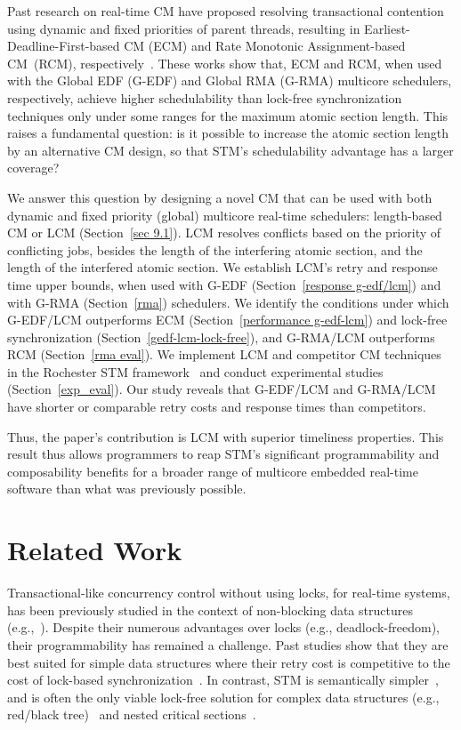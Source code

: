 \documentclass[letter]{sig-alternate}
\begin{document}
Past research on real-time CM have proposed resolving transactional contention using dynamic and fixed priorities of parent threads, resulting in Earliest-Deadline-First-based CM (ECM) and Rate Monotonic Assignment-based CM~(RCM), respectively~\cite{fahmy2009bounding,fahmy2009response,stmconcurrencycontrol:emsoft11}.
These works show that, ECM and RCM, when used with the Global EDF (G-EDF) and Global RMA  (G-RMA) multicore schedulers, respectively, achieve higher schedulability than lock-free synchronization techniques only under some ranges for the maximum atomic section length. This raises a fundamental question: is it possible to increase the atomic section length by an alternative CM design, so that STM's schedulability advantage has a larger coverage? 

We answer this question by designing a novel CM that can be used with both dynamic and fixed priority (global) multicore real-time schedulers: length-based CM or LCM (Section~\ref{sec 9.1}). LCM resolves conflicts based on the priority of conflicting jobs, besides the length of the interfering atomic section, and the length of the interfered atomic section.  We establish LCM's retry and response time upper bounds, when used with G-EDF (Section~\ref{response g-edf/lcm}) and with G-RMA (Section~\ref{rma}) schedulers. We identify the conditions under which G-EDF/LCM outperforms ECM (Section~\ref{performance g-edf-lcm}) and lock-free synchronization (Section~\ref{gedf-lcm-lock-free}), and G-RMA/LCM outperforms RCM (Section~\ref{rma eval}). 
We implement LCM and competitor CM techniques in the Rochester STM framework~\cite{marathe2006lowering} and conduct experimental studies (Section~\ref{exp_eval}). Our study reveals that G-EDF/LCM and G-RMA/LCM have shorter or comparable retry costs and response times than competitors. 

Thus, the paper's contribution is LCM with superior timeliness properties. This result thus allows programmers to reap STM's significant programmability and composability benefits for a broader range of multicore embedded real-time software than what was previously possible.


\section{Related Work}
\label{sec:past}

Transactional-like concurrency control without using locks, for real-time systems, has been previously studied in the context of non-blocking data structures (e.g.,~\cite{anderson95realtime}). Despite their numerous advantages over locks 
(e.g., deadlock-freedom), 
their programmability has remained a challenge. 
Past studies show that they are best suited for simple data structures where their retry cost is competitive to the cost of lock-based synchronization~\cite{bc+08}.  In contrast, STM is semantically simpler~\cite{Herlihy:2006:AMP:1146381.1146382}, and is often the only viable lock-free solution for complex data structures (e.g., red/black tree)~\cite{key-1} and nested critical sections~\cite{Saha:2006:MHP:1122971.1123001}.
\end{document}
